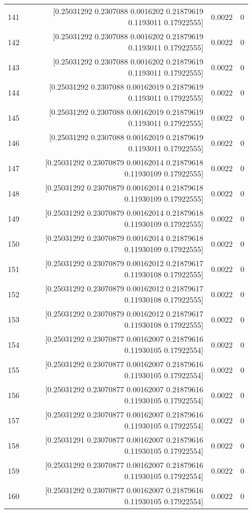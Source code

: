 \begin{longtable}{lrrr}
141 & [0.25031292 0.2307088  0.0016202  0.21879619 0.1193011  0.17922555] & 0.0022 & 0 \\
142 & [0.25031292 0.2307088  0.0016202  0.21879619 0.1193011  0.17922555] & 0.0022 & 0 \\
143 & [0.25031292 0.2307088  0.0016202  0.21879619 0.1193011  0.17922555] & 0.0022 & 0 \\
144 & [0.25031292 0.2307088  0.00162019 0.21879619 0.1193011  0.17922555] & 0.0022 & 0 \\
145 & [0.25031292 0.2307088  0.00162019 0.21879619 0.1193011  0.17922555] & 0.0022 & 0 \\
146 & [0.25031292 0.2307088  0.00162019 0.21879619 0.1193011  0.17922555] & 0.0022 & 0 \\
147 & [0.25031292 0.23070879 0.00162014 0.21879618 0.11930109 0.17922555] & 0.0022 & 0 \\
148 & [0.25031292 0.23070879 0.00162014 0.21879618 0.11930109 0.17922555] & 0.0022 & 0 \\
149 & [0.25031292 0.23070879 0.00162014 0.21879618 0.11930109 0.17922555] & 0.0022 & 0 \\
150 & [0.25031292 0.23070879 0.00162014 0.21879618 0.11930109 0.17922555] & 0.0022 & 0 \\
151 & [0.25031292 0.23070879 0.00162012 0.21879617 0.11930108 0.17922555] & 0.0022 & 0 \\
152 & [0.25031292 0.23070879 0.00162012 0.21879617 0.11930108 0.17922555] & 0.0022 & 0 \\
153 & [0.25031292 0.23070879 0.00162012 0.21879617 0.11930108 0.17922555] & 0.0022 & 0 \\
154 & [0.25031292 0.23070877 0.00162007 0.21879616 0.11930105 0.17922554] & 0.0022 & 0 \\
155 & [0.25031292 0.23070877 0.00162007 0.21879616 0.11930105 0.17922554] & 0.0022 & 0 \\
156 & [0.25031292 0.23070877 0.00162007 0.21879616 0.11930105 0.17922554] & 0.0022 & 0 \\
157 & [0.25031292 0.23070877 0.00162007 0.21879616 0.11930105 0.17922554] & 0.0022 & 0 \\
158 & [0.25031291 0.23070877 0.00162007 0.21879616 0.11930105 0.17922554] & 0.0022 & 0 \\
159 & [0.25031292 0.23070877 0.00162007 0.21879616 0.11930105 0.17922554] & 0.0022 & 0 \\
160 & [0.25031292 0.23070877 0.00162007 0.21879616 0.11930105 0.17922554] & 0.0022 & 0 \\

\end{longtable}
